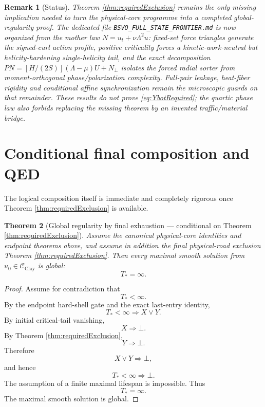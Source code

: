 \documentclass[11pt]{article}
\newtheorem{theorem}{Theorem}[section]
\newtheorem{remark}[theorem]{Remark}
\begin{document}
\begin{remark}[Status]
Theorem \ref{thm:requiredExclusion} remains the only missing implication needed to turn the physical-core programme into a completed global-regularity proof.  The dedicated file \texttt{BSVO\_FULL\_STATE\_FRONTIER.md} is now organized from the mother law $N=u_t+\nu\Lambda^2u$: fixed-set force triangles generate the signed-curl action profile, positive criticality forces a kinetic-work-neutral but helicity-hardening single-helicity tail, and the exact decomposition $PN=[H/(2S)](\Lambda-\mu)U+N_\perp$ isolates the forced radial sorter from moment-orthogonal phase/polarization complexity.  Full-pair leakage, heat-fiber rigidity and conditional affine synchronization remain the microscopic guards on that remainder.  These results do not prove \eqref{eq:YbotRequired}; the quartic phase law also forbids replacing the missing theorem by an invented traffic/material bridge.
\end{remark}

\section{Conditional final composition and QED}

The logical composition itself is immediate and completely rigorous once Theorem \ref{thm:requiredExclusion} is available.

\begin{theorem}[Global regularity by final exhaustion --- conditional on Theorem \ref{thm:requiredExclusion}]\label{thm:conditionalQED}
Assume the canonical physical-core identities and endpoint theorems above, and assume in addition the final physical-road exclusion Theorem \ref{thm:requiredExclusion}.  Then every maximal smooth solution from $u_0\in\mathcal C_{\mathrm{Clay}}$ is global:
\[
T_*=\infty.
\]
\end{theorem}

\begin{proof}
Assume for contradiction that
\[
T_*<\infty.
\]
By the endpoint hard-shell gate and the exact last-entry identity,
\[
T_*<\infty\Longrightarrow X\vee Y.
\]
By initial critical-tail vanishing,
\[
X\Longrightarrow\bot.
\]
By Theorem \ref{thm:requiredExclusion},
\[
Y\Longrightarrow\bot.
\]
Therefore
\[
X\vee Y\Longrightarrow\bot,
\]
and hence
\[
\boxed{T_*<\infty\Longrightarrow\bot.}
\]
The assumption of a finite maximal lifespan is impossible.  Thus
\[
\boxed{T_*=\infty.}
\]
The maximal smooth solution is global.  \qedhere
\end{proof}
\end{document}
